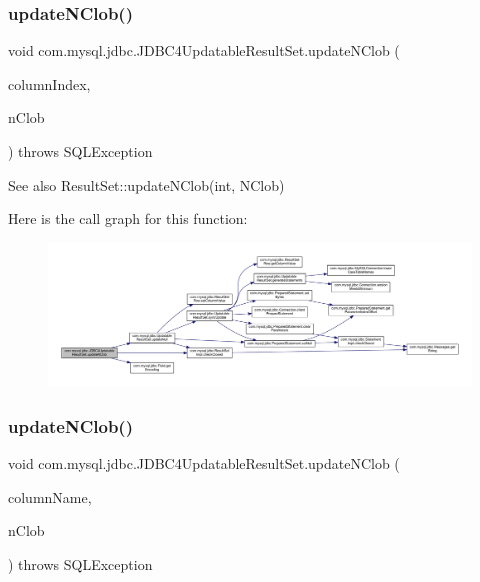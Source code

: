 \subsubsection{\texorpdfstring{update\+N\+Clob()}{updateNClob()}\hspace{0.1cm}{\footnotesize\ttfamily [1/2]}}
{\footnotesize\ttfamily void com.\+mysql.\+jdbc.\+J\+D\+B\+C4\+Updatable\+Result\+Set.\+update\+N\+Clob (\begin{DoxyParamCaption}\item[{int}]{column\+Index,  }\item[{java.\+sql.\+N\+Clob}]{n\+Clob }\end{DoxyParamCaption}) throws S\+Q\+L\+Exception}

\begin{DoxySeeAlso}{See also}
Result\+Set\+::update\+N\+Clob(int, N\+Clob) 
\end{DoxySeeAlso}
Here is the call graph for this function\+:
\nopagebreak
\begin{figure}[H]
\begin{center}
\leavevmode
\includegraphics[width=350pt]{classcom_1_1mysql_1_1jdbc_1_1_j_d_b_c4_updatable_result_set_a5879920869f38b41dd3e54c1896a03da_cgraph}
\end{center}
\end{figure}
\mbox{\label{classcom_1_1mysql_1_1jdbc_1_1_j_d_b_c4_updatable_result_set_a5b0551f803fdd92d96b4d615c9e43179}} 
\subsubsection{\texorpdfstring{update\+N\+Clob()}{updateNClob()}\hspace{0.1cm}{\footnotesize\ttfamily [2/2]}}
{\footnotesize\ttfamily void com.\+mysql.\+jdbc.\+J\+D\+B\+C4\+Updatable\+Result\+Set.\+update\+N\+Clob (\begin{DoxyParamCaption}\item[{String}]{column\+Name,  }\item[{java.\+sql.\+N\+Clob}]{n\+Clob }\end{DoxyParamCaption}) throws S\+Q\+L\+Exception}

